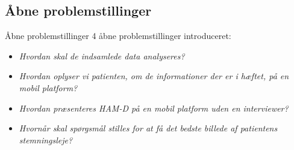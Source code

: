 \subsection{Åbne problemstillinger}
\begin{frame}{Åbne problemstillinger}
4 åbne problemstillinger introduceret:
\begin{itemize}
\item \textit{Hvordan skal de indsamlede data analyseres?}
\item \textit{Hvordan oplyser vi patienten, om de informationer der er i hæftet, på en mobil platform?}
\item \textit{Hvordan præsenteres HAM-D på en mobil platform uden en interviewer?}
\item \textit{Hvornår skal spørgsmål stilles for at få det bedste billede af patientens stemningsleje?}
\end{itemize}
\end{frame}

